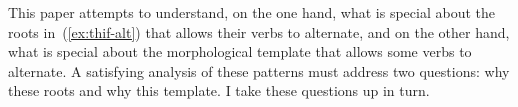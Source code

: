 This paper attempts to understand, on the one hand, what is special about the roots in~(\ref{ex:thif-alt}) that allows their verbs to alternate, and on the other hand, what is special about the morphological template that allows some verbs to alternate. A satisfying analysis of these patterns must address two questions: why these roots and why this template. I take these questions up in turn.

%	
%



